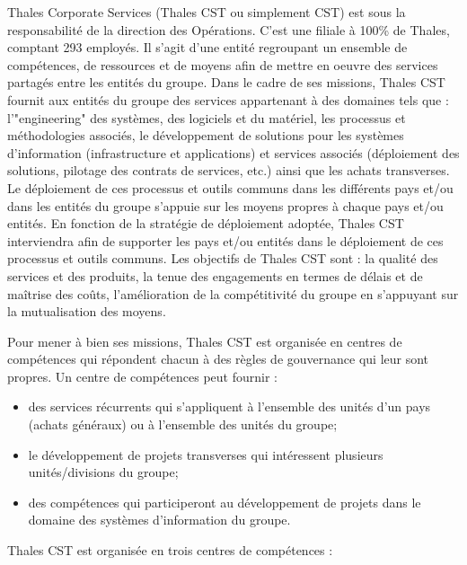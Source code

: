 Thales Corporate Services (Thales CST ou simplement CST) est
sous la responsabilité de la direction des Opérations. C’est une filiale à 100\%
de Thales, comptant 293 employés. Il s'agit d'une entité regroupant un ensemble 
de compétences, de ressources et de moyens afin de mettre en oeuvre des services
partagés entre les entités du groupe. Dans le cadre de ses missions, Thales CST 
fournit aux entités du groupe des services appartenant à des domaines tels que :
l'"engineering" des systèmes, des logiciels et du matériel, les processus et 
méthodologies associés, le développement de solutions pour les systèmes 
d’information (infrastructure et applications) et services associés (déploiement
des solutions, pilotage des contrats de services, etc.) ainsi que les achats 
transverses. Le déploiement de ces processus et outils communs dans les 
différents pays et/ou dans les entités du groupe s’appuie sur les moyens propres
à chaque pays et/ou entités. En fonction de la stratégie de déploiement adoptée,
Thales CST interviendra afin de supporter les pays et/ou entités dans le 
déploiement de ces processus et outils communs. Les objectifs de Thales CST 
sont : la qualité des services et des produits, la tenue des engagements en 
termes de délais et de maîtrise des coûts, l’amélioration de la compétitivité du
groupe en s’appuyant sur la mutualisation des moyens.

Pour mener à bien ses missions, Thales CST est organisée en centres de 
compétences qui répondent chacun à des règles de gouvernance qui leur sont 
propres. Un centre de compétences peut fournir : 
\begin{itemize}
	\item{des services récurrents qui s’appliquent à l’ensemble des unités d’un 
	pays (achats généraux) ou à l’ensemble des unités du groupe;}
	\item{le développement de projets transverses qui intéressent plusieurs 
	unités/divisions du groupe;}
	\item{des compétences qui participeront au développement de projets dans le 
	domaine des systèmes d’information du groupe.}
\end{itemize}

Thales CST est organisée en trois centres de compétences : 

